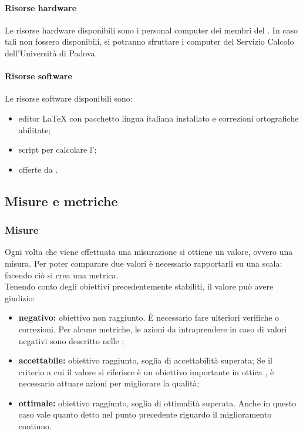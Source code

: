 				\paragraph{Risorse hardware}
				Le risorse hardware disponibili sono i personal computer dei membri del . In caso tali non fossero disponibili, si potranno sfruttare i computer del Servizio Calcolo dell'Università di Padova.
				\paragraph{Risorse software}
				Le risorse software disponibili sono:
				\begin{itemize}
					\item editor \LaTeX{} con pacchetto lingua italiana installato e correzioni ortografiche abilitate;
					\item script per calcolare l';
					\item {} offerte da .
				\end{itemize}
		\subsection{Misure e metriche}
			\subsubsection{Misure}
			Ogni volta che viene effettuata una misurazione si ottiene un valore, ovvero una misura. Per poter comparare due valori è necessario rapportarli su una scala: facendo ciò si crea una metrica. \\
			Tenendo conto degli obiettivi precedentemente stabiliti, il valore può avere giudizio:
			\begin{itemize}
				\item \textbf{negativo:} obiettivo non raggiunto. È necessario fare ulteriori verifiche o correzioni. Per alcune metriche, le azioni da intraprendere in caso di valori negativi sono descritto nelle \ndpv;
				\item \textbf{accettabile:} obiettivo raggiunto, soglia di accettabilità superata;
				 Se il criterio a cui il valore si riferisce è un obiettivo importante in ottica , è necessario attuare azioni per migliorare la qualità;
				\item \textbf{ottimale:} obiettivo raggiunto, soglia di ottimalità superata. Anche in questo caso vale quanto detto nel punto precedente riguardo il miglioramento continuo.
			\end{itemize}
